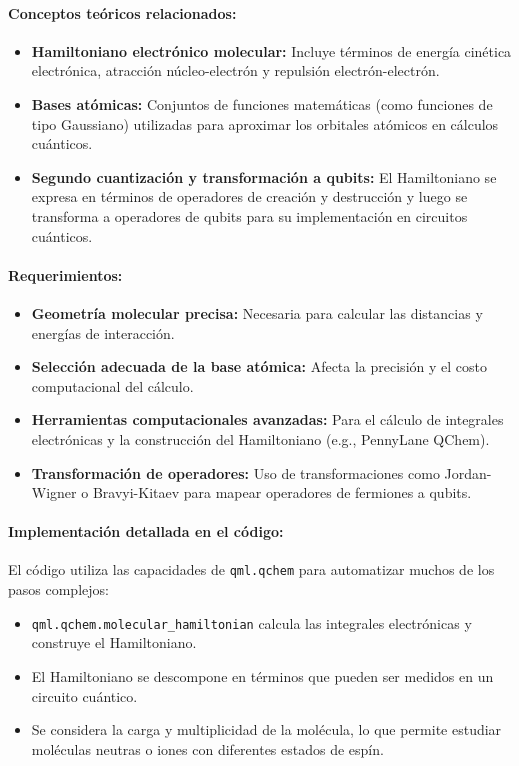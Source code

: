 \paragraph{Conceptos teóricos relacionados:}

\begin{itemize}
    \item \textbf{Hamiltoniano electrónico molecular:} Incluye términos de energía cinética electrónica, atracción núcleo-electrón y repulsión electrón-electrón.
    \item \textbf{Bases atómicas:} Conjuntos de funciones matemáticas (como funciones de tipo Gaussiano) utilizadas para aproximar los orbitales atómicos en cálculos cuánticos.
    \item \textbf{Segundo cuantización y transformación a qubits:} El Hamiltoniano se expresa en términos de operadores de creación y destrucción y luego se transforma a operadores de qubits para su implementación en circuitos cuánticos.
\end{itemize}

\paragraph{Requerimientos:}

\begin{itemize}
    \item \textbf{Geometría molecular precisa:} Necesaria para calcular las distancias y energías de interacción.
    \item \textbf{Selección adecuada de la base atómica:} Afecta la precisión y el costo computacional del cálculo.
    \item \textbf{Herramientas computacionales avanzadas:} Para el cálculo de integrales electrónicas y la construcción del Hamiltoniano (e.g., PennyLane QChem).
    \item \textbf{Transformación de operadores:} Uso de transformaciones como Jordan-Wigner o Bravyi-Kitaev para mapear operadores de fermiones a qubits.
\end{itemize}

\paragraph{Implementación detallada en el código:}

El código utiliza las capacidades de \texttt{qml.qchem} para automatizar muchos de los pasos complejos:

\begin{itemize}
    \item \texttt{qml.qchem.molecular\_hamiltonian} calcula las integrales electrónicas y construye el Hamiltoniano.
    \item El Hamiltoniano se descompone en términos que pueden ser medidos en un circuito cuántico.
    \item Se considera la carga y multiplicidad de la molécula, lo que permite estudiar moléculas neutras o iones con diferentes estados de espín.
\end{itemize}

